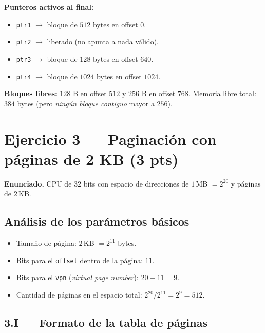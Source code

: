 \documentclass[11pt,a4paper]{article}
\begin{document}
\begin{respuesta}
\textbf{Punteros activos al final:}

\begin{itemize}[leftmargin=*,nosep]
    \item \texttt{ptr1} $\to$ bloque de $512$ bytes en offset $0$.
    \item \texttt{ptr2} $\to$ liberado (no apunta a nada válido).
    \item \texttt{ptr3} $\to$ bloque de $128$ bytes en offset $640$.
    \item \texttt{ptr4} $\to$ bloque de $1024$ bytes en offset $1024$.
\end{itemize}

\textbf{Bloques libres:} $128$ B en offset $512$ y $256$ B en offset
$768$. Memoria libre total: $384$ bytes (pero \emph{ningún bloque
contiguo} mayor a $256$).
\end{respuesta}

\section{Ejercicio 3 --- Paginación con páginas de 2 KB (3 pts)}

\textbf{Enunciado.} CPU de 32 bits con espacio de direcciones de
$1$\,MB $= 2^{20}$ y páginas de $2$\,KB.

\subsection*{Análisis de los parámetros básicos}

\begin{itemize}[leftmargin=*,nosep]
    \item Tamaño de página: $2$\,KB $= 2^{11}$ bytes.
    \item Bits para el \texttt{offset} dentro de la página: $11$.
    \item Bits para el \texttt{vpn} (\emph{virtual page number}):
        $20 - 11 = 9$.
    \item Cantidad de páginas en el espacio total: $2^{20} / 2^{11}
        = 2^9 = 512$.
\end{itemize}

\subsection*{3.I --- Formato de la tabla de páginas}
\end{document}
